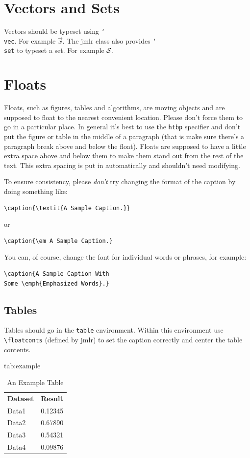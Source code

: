\documentclass[mlabstract]{jmlr}
\newcommand{\cs}[1]{\texttt{\char`\\#1}}
\begin{document}
\section{Vectors and Sets}
\label{sec:vec}

Vectors should be typeset using \cs{vec}. For example $\vec{x}$.
The \textsf{jmlr} class also provides \cs{set} to typeset a
set. For example $\mathcal{S}$.

\section{Floats}
\label{sec:floats}

Floats, such as figures, tables and algorithms, are moving
objects and are supposed to float to the nearest convenient
location. Please don't force them to go in a particular place. In
general it's best to use the \texttt{htbp} specifier and don't
put the figure or table in the middle of a paragraph (that is
make sure there's a paragraph break above and below the float).
Floats are supposed to have a little extra space above and below
them to make them stand out from the rest of the text. This extra
spacing is put in automatically and shouldn't need modifying.

To ensure consistency, please \emph{don't} try changing the format of the caption by doing
something like:
\begin{verbatim}
\caption{\textit{A Sample Caption.}}
\end{verbatim}
or
\begin{verbatim}
\caption{\em A Sample Caption.}
\end{verbatim}
You can, of course, change the font for individual words or 
phrases, for example:
\begin{verbatim}
\caption{A Sample Caption With 
Some \emph{Emphasized Words}.}
\end{verbatim}

\subsection{Tables}
\label{sec:tables}

Tables should go in the \texttt{table} environment. Within this
environment use \verb|\floatconts| (defined by \textsf{jmlr})
to set the caption correctly and center the table contents.

\begin{table}[htbp]
\floatconts
  {tab:example}%
  {\caption{An Example Table}}%
  {\begin{tabular}{ll}
  \bfseries Dataset & \bfseries Result\\
  Data1 & 0.12345\\
  Data2 & 0.67890\\
  Data3 & 0.54321\\
  Data4 & 0.09876
  \end{tabular}}
\end{table}
\end{document}
